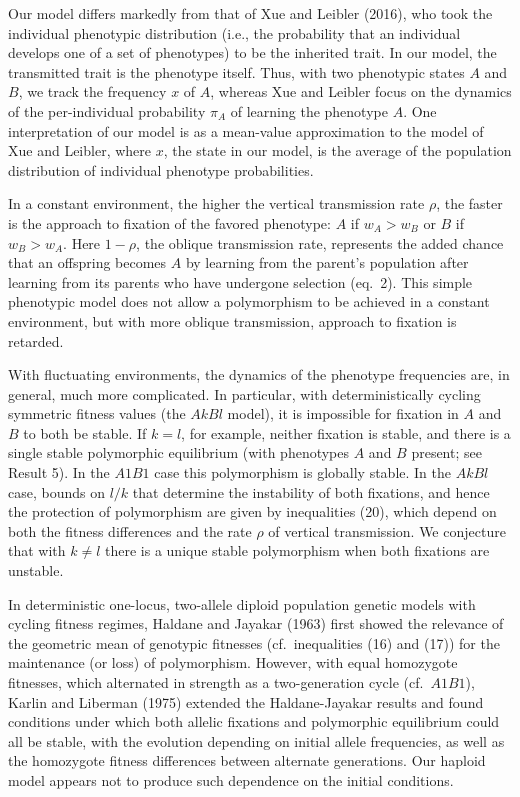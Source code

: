 Our model differs markedly from that of Xue and Leibler (2016), who took the individual phenotypic distribution (i.e., the probability that an individual develops one of a set of phenotypes) to be the inherited trait. In our model, the transmitted trait is the phenotype itself. Thus, with two phenotypic states $A$ and $B$, we track the frequency $x$ of $A$, whereas Xue and Leibler focus on the dynamics of the per-individual probability $\pi_A$ of learning the phenotype $A$. One interpretation of our model is as a mean-value approximation to the model of Xue and Leibler, where $x$, the state in our model, is the average of the population distribution of individual phenotype probabilities. 

In a constant environment, the higher the vertical transmission rate $\rho$, the faster is the approach to fixation of the favored phenotype: $A$ if $w_A>w_B$ or $B$ if $w_B>w_A$. Here $1-\rho$, the oblique transmission rate, represents the added chance that an offspring becomes $A$ by learning from the parent's population after learning from its parents who have undergone selection (eq.\ 2). This simple phenotypic model does not allow a polymorphism to be achieved in a constant environment, but with more oblique transmission, approach to fixation is retarded.

 With fluctuating environments, the dynamics of the phenotype frequencies are, in general, much more complicated. In particular, with deterministically cycling symmetric fitness values (the $AkBl$ model), it is impossible for fixation in $A$ and $B$ to both be stable. If $k=l$, for example, neither fixation is stable, and there is a single stable polymorphic equilibrium (with phenotypes $A$ and $B$ present; see Result 5). In the $A1B1$ case this  polymorphism is globally stable. In the $AkBl$ case, bounds on $l/k$ that determine the instability of both fixations, and hence the protection of polymorphism are given by inequalities (20), which depend on both the fitness differences and the rate $\rho$ of vertical transmission. We conjecture that with $k\ne l$ there is a unique stable polymorphism when both fixations are unstable.
 
 In deterministic one-locus, two-allele diploid population genetic models with cycling fitness regimes, Haldane and Jayakar (1963) first showed the relevance of the geometric mean of genotypic fitnesses (cf.\ inequalities (16) and (17)) for the maintenance (or loss) of polymorphism. However, with equal homozygote fitnesses, which alternated in strength as a two-generation cycle (cf.\ $A1B1$), Karlin and Liberman (1975) extended the Haldane-Jayakar results and found conditions under which both allelic fixations and polymorphic equilibrium could all be stable, with the evolution depending on initial allele frequencies, as well as the homozygote fitness differences between alternate generations. Our haploid model appears not to produce such dependence on the initial conditions.
 
